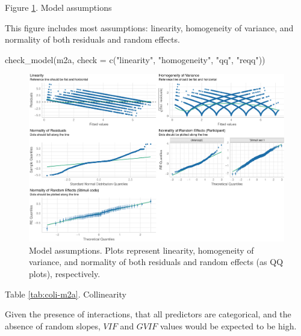 \documentclass[
  bookmarksnumbered]{article}
\newenvironment{Shaded}{\begin{snugshade}}{\end{snugshade}}
\newcommand{\AttributeTok}[1]{\textcolor[rgb]{0.80,0.80,0.80}{#1}}
\newcommand{\FunctionTok}[1]{\textcolor[rgb]{0.94,0.94,0.56}{#1}}
\newcommand{\NormalTok}[1]{\textcolor[rgb]{0.80,0.80,0.80}{#1}}
\newcommand{\StringTok}[1]{\textcolor[rgb]{0.80,0.58,0.58}{#1}}
\begin{document}
Figure \ref{fig:assu-m2a}. Model assumptions

This figure includes most assumptions: linearity, homogeneity of variance, and normality of both residuals and random effects.

\begin{Shaded}
\begin{Highlighting}[]
\FunctionTok{check\_model}\NormalTok{(m2a,}
            \AttributeTok{check =} \FunctionTok{c}\NormalTok{(}\StringTok{"linearity"}\NormalTok{, }\StringTok{"homogeneity"}\NormalTok{, }\StringTok{"qq"}\NormalTok{, }\StringTok{"reqq"}\NormalTok{))}
\end{Highlighting}
\end{Shaded}

\begin{figure}
\centering
\includegraphics{Sexual_Desire_Arousal_files/figure-latex/assu-m2a-1.pdf}
\caption{\label{fig:assu-m2a}Model assumptions. Plots represent linearity, homogeneity of variance, and normality of both residuals and random effects (as QQ plots), respectively.}
\end{figure}

Table \ref{tab:coli-m2a}. Collinearity

Given the presence of interactions, that all predictors are categorical, and the absence of random slopes, \(VIF\) and \(GVIF\) values would be expected to be high.
\end{document}
